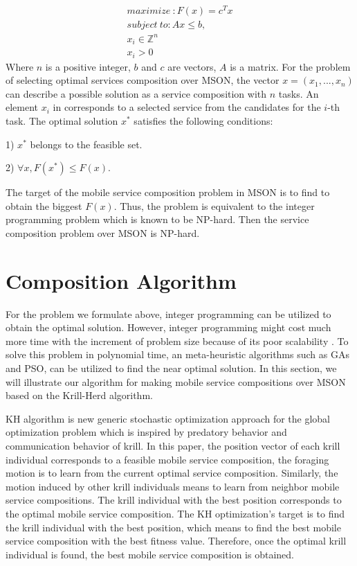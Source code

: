 \documentclass[10pt,journal,compsoc]{IEEEtran}
\begin{document}
\begin{eqnarray}
maximize \  : F(x) = c^{T}x     \\\nonumber
subject \ to: Ax \le b, \\\nonumber
x_i \in \mathbb{Z}^{n} \\\nonumber
x_i > 0 
\end{eqnarray}
Where $n$ is a positive integer, $b$ and $c$ are vectors, $A$ is a matrix.
For the problem of selecting optimal services composition over MSON, the vector $x = (x_1, . . . , x_n)$ can describe a possible solution as a service composition with $n$ tasks. An element $x_i$ in corresponds to a selected service from the candidates for the $i$-th task.
The optimal solution  $x^*$ satisfies the following conditions:

1) $x^*$ belongs to the feasible set.

​2) $\forall x, F(x^*) \le F(x)$. 

The target of the mobile service composition problem in MSON is to find to obtain the biggest $F(x)$. Thus, the problem is equivalent to the integer programming problem which is known to be NP-hard. Then the service composition problem over MSON is NP-hard.

\section{Composition Algorithm}
For the problem we formulate above, integer programming can be utilized to obtain the optimal solution. However, integer programming might cost much more time with the increment of problem size because of its poor scalability \cite{nemhauser1988integer}. To solve this problem in polynomial time, an meta-heuristic algorithms such as GAs and PSO, can be utilized to find the near optimal solution.
In this section, we will illustrate our algorithm for making mobile service compositions over MSON based on the Krill-Herd algorithm.

​KH algorithm \cite{gandomi2012krill} is new generic stochastic optimization approach for the global optimization problem which is inspired by predatory behavior and communication behavior of krill. 
In this paper, the position vector of each krill individual corresponds to a feasible mobile service composition, 
the foraging motion is to learn from the current optimal service composition. 
Similarly, the motion induced by other krill individuals means to learn from neighbor mobile service compositions.
The krill individual with the best position corresponds to the optimal mobile service composition. 
The KH optimization's target is to find the krill individual with the best position, which means to find the best mobile service composition with the best fitness value. 
Therefore, once the optimal krill individual is found, the best mobile service composition is obtained.
\end{document}

